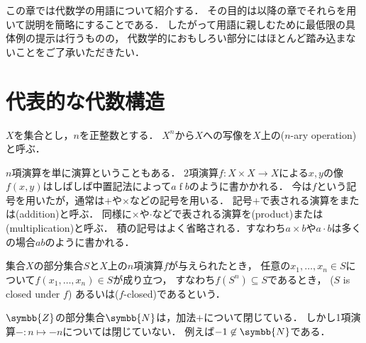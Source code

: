 \documentclass[../main.tex]{subfiles}
\begin{document}

この章では代数学の用語について紹介する．
その目的は以降の章でそれらを用いて説明を簡略にすることである．
したがって用語に親しむために最低限の具体例の提示は行うものの，
代数学的におもしろい部分にはほとんど踏み込まないことをご了承いただきたい．

\section{代表的な代数構造}

\begin{thmbox}
\begin{definition}
\(X\)を集合とし，\(n\)を正整数とする．
\(X^n\)から\(X\)への写像を\(X\)上の(\(n\)-ary operation)と呼ぶ{\footnotemark}．
\end{definition}
\end{thmbox}


\(n\)項演算を単に演算ということもある．
\(2\)項演算\(f \colon X \times X \to X\)による\(x, y\)の像\(f(x, y)\)はしばしば中置記法によって\(a \mathbin{f} b\)のように書かかれる．
今は\(f\)という記号を用いたが，通常は\(\mathord{+}\)や\(\mathord{\times}\)などの記号を用いる．
記号\(\mathord{+}\)で表される演算をまたは(addition)と呼ぶ．
同様に\(\mathord{\times}\)や\(\mathord{\cdot}\)などで表される演算を(product)または(multiplication)と呼ぶ．
積の記号はよく省略される．すなわち\(a \times b\)や\(a \cdot b\)は多くの場合\(ab\)のように書かれる．

集合\(X\)の部分集合\(S\)と\(X\)上の\(n\)項演算\(f\)が与えられたとき，
任意の\(x_1, \ldots, x_n \in S\)について\(f(x_1, \ldots, x_n) \in S\)が成り立つ，
すなわち\(f(S^n) \subseteq S\)であるとき，
(\(S\) is closed under \(f\))
あるいは(\(f\)-closed)であるという．

\begin{exa} \(\symbb{Z}\)の部分集合\(\symbb{N}\)は，加法\(\mathord{+}\)について閉じている．
しかし1項演算\(\mathord{-}\colon n \mapsto -n\)については閉じていない．
例えば\(-1 \not\in \symbb{N}\)である．
\end{exa}
\end{document}
